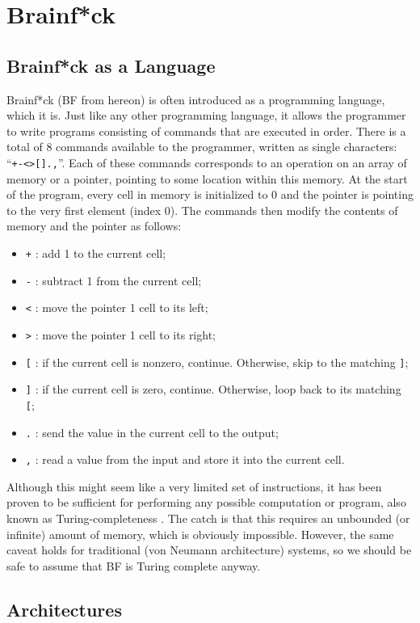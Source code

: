 \section{Brainf*ck}\label{section:brainfck}
\subsection{Brainf*ck as a Language}
Brainf*ck (BF from hereon) is often introduced as a programming language, which it is. Just like any other programming language, it allows the programmer to write programs consisting of commands that are executed in order. There is a total of 8 commands available to the programmer, written as single characters: ``\texttt{+-<>[].,}''. Each of these commands corresponds to an operation on an array of memory or a pointer, pointing to some location within this memory. At the start of the program, every cell in memory is initialized to 0 and the pointer is pointing to the very first element (index 0). The commands then modify the contents of memory and the pointer as follows:
\begin{itemize}
\item \texttt{+} : add 1 to the current cell;
\item \texttt{-} : subtract 1 from the current cell;
\item \texttt{<} : move the pointer 1 cell to its left;
\item \texttt{>} : move the pointer 1 cell to its right;
\item \texttt{[} : if the current cell is nonzero, continue. Otherwise, skip to the matching \texttt{]};
\item \texttt{]} : if the current cell is zero, continue. Otherwise, loop back to its matching \texttt{[};
  \item \texttt{.} : send the value in the current cell to the output;
  \item \texttt{,} : read a value from the input and store it into the current cell.
\end{itemize}
Although this might seem like a very limited set of instructions, it has been proven to be sufficient for performing any possible computation or program, also known as Turing-completeness \cite{esolang}. The catch is that this requires an unbounded (or infinite) amount of memory, which is obviously impossible. However, the same caveat holds for traditional (von Neumann architecture) systems, so we should be safe to assume that BF is Turing complete anyway.

\subsection{Architectures}
